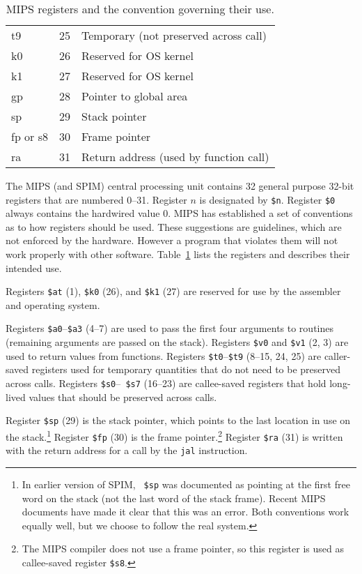 \documentclass[11pt]{article}
\begin{document}
\begin{table}
\begin{center}
\begin{tabular}{|l|r|l|}
      t9 & 25 & Temporary (not preserved across call) \\
      k0 & 26 & Reserved for OS kernel \\
      k1 & 27 & Reserved for OS kernel \\
      gp & 28 & Pointer to global area \\
      sp & 29 & Stack pointer \\
      fp or s8 & 30 & Frame pointer \\
      ra & 31 & Return address (used by function call) \\
     \hline
  \end{tabular}
  \end{center}
  \caption{MIPS registers and the convention governing their use.}
  \label{tab:reg}
\end{table}

The MIPS (and SPIM) central processing unit contains 32 general
purpose 32-bit registers that are numbered 0--31.  Register $n$ is designated
by {\tt \$n}.  Register {\tt \$0} always contains the hardwired value
0.  MIPS has established a set of conventions as to how registers
should be used.  These suggestions are guidelines, which are not
enforced by the hardware.  However a program that violates them will
not work properly with other software.  Table~\ref{tab:reg} lists the
registers and describes their intended use.

Registers {\tt \$at} (1), {\tt \$k0} (26), and {\tt \$k1} (27) are
reserved for use by the assembler and operating system.

Registers {\tt \$a0}--{\tt \$a3} (4--7) are used to pass the first
four arguments to routines (remaining arguments are passed on the
stack).  Registers {\tt \$v0} and {\tt \$v1} (2, 3) are used to return
values from functions.  Registers {\tt \$t0}--{\tt \$t9} (8--15, 24,
25) are caller-saved registers used for temporary quantities that do
not need to be preserved across calls.  Registers {\tt \$s0}--{\tt
\$s7} (16--23) are callee-saved registers that hold long-lived values
that should be preserved across calls.

Register {\tt \$sp} (29) is the stack pointer, which points to the last
location in use on the stack.\footnote{In earlier version of SPIM, {\tt
\$sp} was documented as pointing at the first free word on the stack (not
the last word of the stack frame).  Recent MIPS documents have made it clear
that this was an error.  Both conventions work equally well, but we choose
to follow the real system.}  Register {\tt \$fp} (30) is the frame
pointer.\footnote{The MIPS compiler does not use a frame pointer, so this
register is used as callee-saved register {\tt \$s8}.} Register {\tt \$ra}
(31) is written with the return address for a call by the {\tt jal}
instruction.
\end{document}
